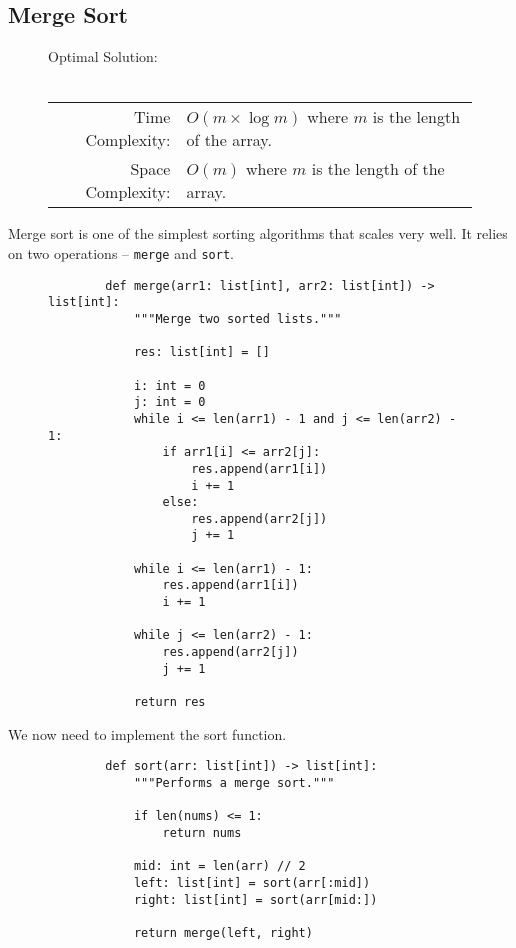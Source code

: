 
\subsection{Merge Sort}

\begin{figure}[H]
    Optimal Solution:\\\\
    \begin{tabular}{rl}
        Time Complexity:& \(O(m \times \log{m})\) where \(m\) is the length of
        the array.\\
        Space Complexity:& \(O(m)\) where \(m\) is the length of the array.
    \end{tabular}
\end{figure}

Merge sort is one of the simplest sorting algorithms that scales very well. It
relies on two operations -- \texttt{merge} and
\texttt{sort}.

\begin{figure}[H]
    \centering
    \begin{verbatim}
        def merge(arr1: list[int], arr2: list[int]) -> list[int]:
            """Merge two sorted lists."""

            res: list[int] = []

            i: int = 0
            j: int = 0
            while i <= len(arr1) - 1 and j <= len(arr2) - 1:
                if arr1[i] <= arr2[j]:
                    res.append(arr1[i])
                    i += 1
                else:
                    res.append(arr2[j])
                    j += 1
            
            while i <= len(arr1) - 1:
                res.append(arr1[i])
                i += 1

            while j <= len(arr2) - 1:
                res.append(arr2[j])
                j += 1

            return res
    \end{verbatim}
\end{figure}

We now need to implement the sort function.

\begin{figure}[H]
    \centering
    \begin{verbatim}
        def sort(arr: list[int]) -> list[int]:
            """Performs a merge sort."""

            if len(nums) <= 1:
                return nums
            
            mid: int = len(arr) // 2
            left: list[int] = sort(arr[:mid])
            right: list[int] = sort(arr[mid:])

            return merge(left, right)
    \end{verbatim}
\end{figure}

